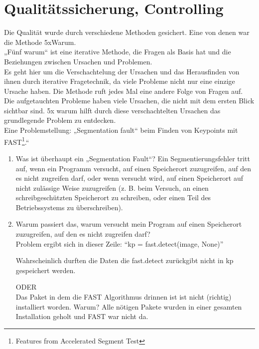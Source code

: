 \section{Qualitätssicherung, Controlling}
\begin{flushleft}
	

Die Qualität wurde durch verschiedene Methoden gesichert. Eine von denen war die
Methode 5xWarum. 
\\
 
„Fünf warum“ ist eine iterative Methode, die Fragen als Basis hat und die
Beziehungen zwischen Ursachen und Problemen. \\
Es geht hier um die Verschachtelung der Ursachen und das Herausfinden von ihnen durch iterative Fragetechnik, da viele Probleme nicht nur eine einzige Ursache haben. 
Die Methode ruft jedes Mal eine andere Folge von Fragen auf.\cite{fmea}
\\

Die aufgetauchten Probleme haben viele Ursachen, die nicht mit dem ersten Blick
sichtbar sind. 5x warum hilft durch diese verschachtelten Ursachen das
grundlegende Problem zu entdecken. \\

Eine Problemstellung: „Segmentation fault“ beim Finden von Keypoints mit
FAST\footnote{Features from Accelerated Segment Test}.“ 


\begin{enumerate}
	
	
	\item 	Was ist überhaupt ein „Segmentation Fault“? 
	Ein Segmentierungsfehler tritt auf, wenn ein Programm versucht, auf einen
	Speicherort zuzugreifen, auf den es nicht zugreifen darf, oder wenn versucht
	wird, auf einen Speicherort auf nicht zulässige Weise zuzugreifen (z. B. beim
	Versuch, an einen schreibgeschützten Speicherort zu schreiben, oder einen Teil
	des Betriebssystems zu überschreiben).\\
	\item 	Warum passiert das, warum versucht mein Program auf einen Speicherort
	zuzugreifen, auf den es nicht zugreifen darf?\\
	
	Problem ergibt sich in dieser Zeile: 
	“kp = fast.detect(image, None)”
	
	Wahrscheinlich durften die Daten die fast.detect zurückgibt nicht in kp gespeichert
	werden. 
	
	ODER\\
	
	Das Paket in dem die FAST Algorithmus drinnen ist ist nicht (richtig)
	installiert worden.
	Warum? Alle nötigen Pakete wurden in einer gesamten Installation geholt und
	FAST war nicht da. 
	

\end{enumerate}
\end{flushleft}
